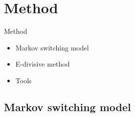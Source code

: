 \documentclass{beamer}
\begin{document}
\section{Method} 
\begin{frame}
Method 
\begin{itemize}
	\item Markov switching model
	\item E-divisive method
	\item Tools
\end{itemize}
\end{frame}
\subsection{Markov switching model}
\end{document}
